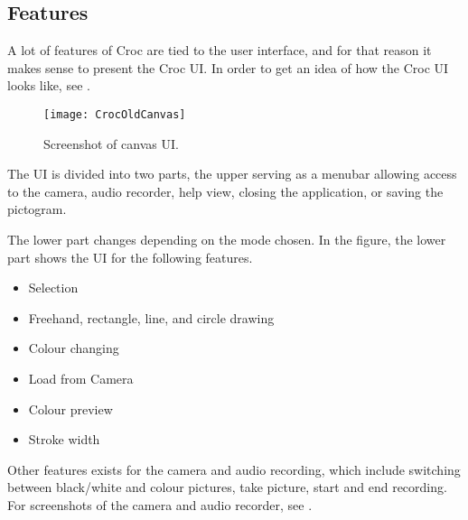 \subsection{Features}
A lot of features of Croc are tied to the user interface, and for that reason it makes sense to present the Croc UI.
In order to get an idea of how the Croc UI looks like, see . 

\begin{figure}[h]
     \centering
     \texttt{[image: CrocOldCanvas]}
     \caption{Screenshot of canvas UI.}
     \label{fig:croc-old-canvas}
\end{figure}

The UI is divided into two parts, the upper serving as a menubar allowing access to the camera, audio recorder, help view, closing the application, or saving the pictogram.

The lower part changes depending on the mode chosen.
In the figure, the lower part shows the UI for the following features.

\begin{itemize}
     \item Selection
     \item Freehand, rectangle, line, and circle drawing
     \item Colour changing
     \item Load from Camera
     \item Colour preview
     \item Stroke width
\end{itemize}

Other features exists for the camera and audio recording, which include switching between black/white and colour pictures, take picture, start and end recording.
For screenshots of the camera and audio recorder, see .

